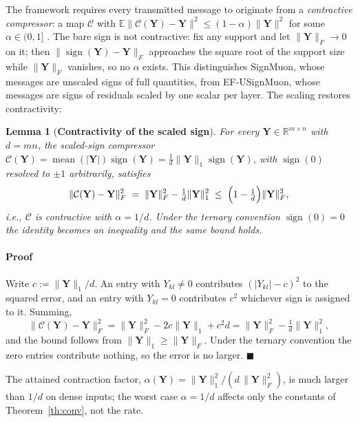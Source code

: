 \documentclass{article}
\newtheorem{lemma}{Lemma}
\begin{document}
The framework requires every transmitted message to originate from a \emph{contractive compressor}: a map $\mathcal{C}$ with $\mathbb{E}\|\mathcal{C}(\mathbf{Y})-\mathbf{Y}\|^2 \le (1-\alpha)\|\mathbf{Y}\|^2$ for some $\alpha \in (0,1]$ \citep[Definition~1]{gruntkowska2025error}. The bare sign is not contractive: fix any support and let $\|\mathbf{Y}\|_F \to 0$ on it; then $\|\operatorname{sign}(\mathbf{Y})-\mathbf{Y}\|_F$ approaches the square root of the support size while $\|\mathbf{Y}\|_F$ vanishes, so no $\alpha$ exists. This distinguishes SignMuon, whose messages are unscaled signs of full quantities, from EF-USignMuon, whose messages are signs of residuals scaled by one scalar per layer. The scaling restores contractivity:

\begin{lemma}[\textbf{Contractivity of the scaled sign}]\label{lem:signcontr}
For every $\mathbf{Y} \in \mathbb{R}^{m\times n}$ with $d = mn$, the scaled-sign compressor $\mathcal{C}(\mathbf{Y}) = \operatorname{mean}(|\mathbf{Y}|)\operatorname{sign}(\mathbf{Y}) = \tfrac{1}{d}\|\mathbf{Y}\|_1 \operatorname{sign}(\mathbf{Y})$, with $\operatorname{sign}(0)$ resolved to $\pm1$ arbitrarily, satisfies
\begin{equation}\label{eq:sign_identity}
\|\mathcal{C}(\mathbf{Y})-\mathbf{Y}\|_F^2 \;=\; \|\mathbf{Y}\|_F^2 - \tfrac{1}{d}\|\mathbf{Y}\|_1^2 \;\le\; \Bigl(1-\tfrac{1}{d}\Bigr)\|\mathbf{Y}\|_F^2,
\end{equation}
i.e., $\mathcal{C}$ is contractive with $\alpha = 1/d$. Under the ternary convention $\operatorname{sign}(0)=0$ the identity becomes an inequality and the same bound holds.
\end{lemma}
\paragraph{Proof} Write $c := \|\mathbf{Y}\|_1/d$. An entry with $Y_{kl}\ne0$ contributes $(|Y_{kl}|-c)^2$ to the squared error, and an entry with $Y_{kl}=0$ contributes $c^2$ whichever sign is assigned to it. Summing,
\[
\|\mathcal{C}(\mathbf{Y})-\mathbf{Y}\|_F^2 = \|\mathbf{Y}\|_F^2 - 2c\|\mathbf{Y}\|_1 + c^2 d = \|\mathbf{Y}\|_F^2 - \tfrac{1}{d}\|\mathbf{Y}\|_1^2,
\]
and the bound follows from $\|\mathbf{Y}\|_1 \ge \|\mathbf{Y}\|_F$. Under the ternary convention the zero entries contribute nothing, so the error is no larger. $\blacksquare$

The attained contraction factor, $\alpha(\mathbf{Y}) = \|\mathbf{Y}\|_1^2/(d\,\|\mathbf{Y}\|_F^2)$, is much larger than $1/d$ on dense inputs; the worst case $\alpha = 1/d$ affects only the constants of Theorem~\ref{th:conv}, not the rate.
\end{document}
